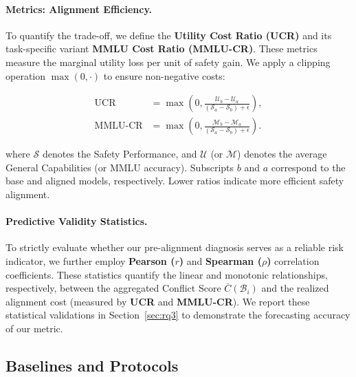 \documentclass[11pt]{article}
\begin{document}
\paragraph{Metrics: Alignment Efficiency.}
To quantify the trade-off, we define the \textbf{Utility Cost Ratio (UCR)} and its task-specific variant \textbf{MMLU Cost Ratio (MMLU-CR)}. These metrics measure the marginal utility loss per unit of safety gain. We apply a clipping operation $\max(0, \cdot)$ to ensure non-negative costs:

\begin{align}
    \text{UCR} &= \max\left(0, \frac{\mathcal{U}_{b} - \mathcal{U}_{a}}{(\mathcal{S}_{a} - \mathcal{S}_{b}) + \epsilon}\right), \\
    \text{MMLU-CR} &= \max\left(0, \frac{\mathcal{M}_{b} - \mathcal{M}_{a}}{(\mathcal{S}_{a} - \mathcal{S}_{b}) + \epsilon}\right).
\end{align}

\noindent where $\mathcal{S}$ denotes the Safety Performance, and $\mathcal{U}$ (or $\mathcal{M}$) denotes the average General Capabilities (or MMLU accuracy). Subscripts $b$ and $a$ correspond to the base and aligned models, respectively. Lower ratios indicate more efficient safety alignment.
\paragraph{Predictive Validity Statistics.}
To strictly evaluate whether our pre-alignment diagnosis serves as a reliable risk indicator, we further employ \textbf{Pearson ($r$)} and \textbf{Spearman ($\rho$)} correlation coefficients. These statistics quantify the linear and monotonic relationships, respectively, between the aggregated Conflict Score $\overline{C}(\mathcal{B}_i)$ and the realized alignment cost (measured by \textbf{UCR} and \textbf{MMLU-CR}). We report these statistical validations in Section~\ref{sec:rq3} to demonstrate the forecasting accuracy of our metric.

\subsection{Baselines and Protocols}
\end{document}
